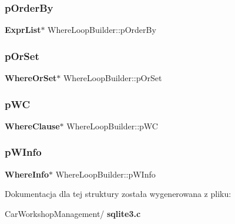 \subsubsection{pOrderBy}
{\footnotesize\ttfamily \textbf{ Expr\+List}$\ast$ Where\+Loop\+Builder\+::p\+Order\+By}

\mbox{\label{struct_where_loop_builder_adf94dbe3918353f2d9ebfc0bf69d9685}} 
\subsubsection{pOrSet}
{\footnotesize\ttfamily \textbf{ Where\+Or\+Set}$\ast$ Where\+Loop\+Builder\+::p\+Or\+Set}

\mbox{\label{struct_where_loop_builder_aff76c3f8b34e4588c587708d59fb6bc9}} 
\subsubsection{pWC}
{\footnotesize\ttfamily \textbf{ Where\+Clause}$\ast$ Where\+Loop\+Builder\+::p\+WC}

\mbox{\label{struct_where_loop_builder_a45e1ed33ef11ee2c08af6edcda9e5654}} 
\subsubsection{pWInfo}
{\footnotesize\ttfamily \textbf{ Where\+Info}$\ast$ Where\+Loop\+Builder\+::p\+W\+Info}



Dokumentacja dla tej struktury została wygenerowana z pliku\+:\begin{DoxyCompactItemize}
\item 
Car\+Workshop\+Management/\textbf{ sqlite3.\+c}\end{DoxyCompactItemize}
